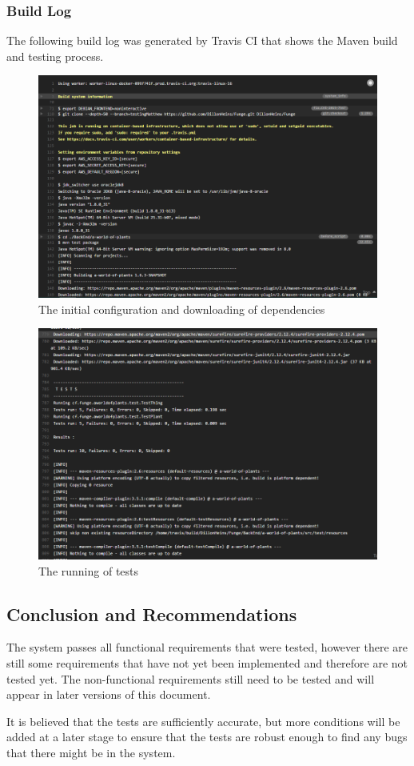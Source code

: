 \documentclass{article}
\begin{document}
		\subsubsection{Build Log}
		The following build log was generated by Travis CI that shows the Maven build and testing process.
		\begin{figure}[H]
			\includegraphics[width=\linewidth]{images/travis1}
			\caption{The initial configuration and downloading of dependencies}
		\end{figure}
		\begin{figure}[H]
			\includegraphics[width=\linewidth]{images/travis2}
			\caption{The running of tests}
		\end{figure}
	\subsection{Conclusion and Recommendations}
		The system passes all functional requirements that were tested, however there are still some requirements that have not yet been implemented and therefore are not tested yet. The non-functional requirements still need to be tested and will appear in later versions of this document. 
		
		It is believed that the tests are sufficiently accurate, but more conditions will be added at a later stage to ensure that the tests are robust enough to find any bugs that there might be in the system.
\end{document}
